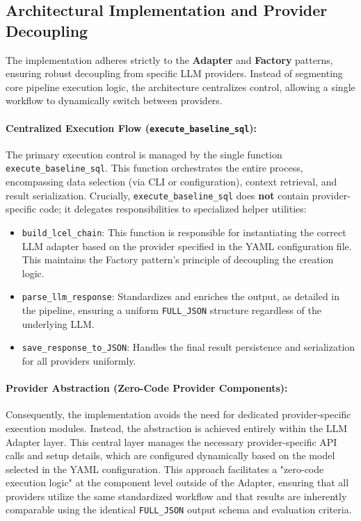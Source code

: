\subsection{Architectural Implementation and Provider Decoupling}
The implementation adheres strictly to the \textbf{Adapter} and \textbf{Factory} patterns, ensuring robust decoupling from specific LLM providers. Instead of segmenting core pipeline execution logic, the architecture centralizes control, allowing a single workflow to dynamically switch between providers.

\paragraph{\textbf{Centralized Execution Flow} (\texttt{execute\_baseline\_sql}):} The primary execution control is managed by the single function \texttt{execute\_baseline\_sql}. This function orchestrates the entire process, encompassing data selection (via CLI or configuration), context retrieval, and result serialization. Crucially, \texttt{execute\_baseline\_sql} does \textbf{not} contain provider-specific code; it delegates responsibilities to specialized helper utilities:
\begin{itemize}[leftmargin=1.5em]
    \item \texttt{build\_lcel\_chain}: This function is responsible for instantiating the correct LLM adapter based on the provider specified in the YAML configuration file. This maintains the Factory pattern's principle of decoupling the creation logic.
    \item \texttt{parse\_llm\_response}: Standardizes and enriches the output, as detailed in the pipeline, ensuring a uniform \texttt{FULL\_JSON} structure regardless of the underlying LLM.
    \item \texttt{save\_response\_to\_JSON}: Handles the final result persistence and serialization for all providers uniformly.
\end{itemize}

\paragraph{\textbf{Provider Abstraction (Zero-Code Provider Components):}}
Consequently, the implementation avoids the need for dedicated provider-specific execution modules. Instead, the abstraction is achieved entirely within the LLM Adapter layer. This central layer manages the necessary provider-specific API calls and setup details, which are configured dynamically based on the model selected in the YAML configuration. This approach facilitates a "zero-code execution logic" at the component level outside of the Adapter, ensuring that all providers utilize the same standardized workflow and that results are inherently comparable using the identical \texttt{FULL\_JSON} output schema and evaluation criteria.